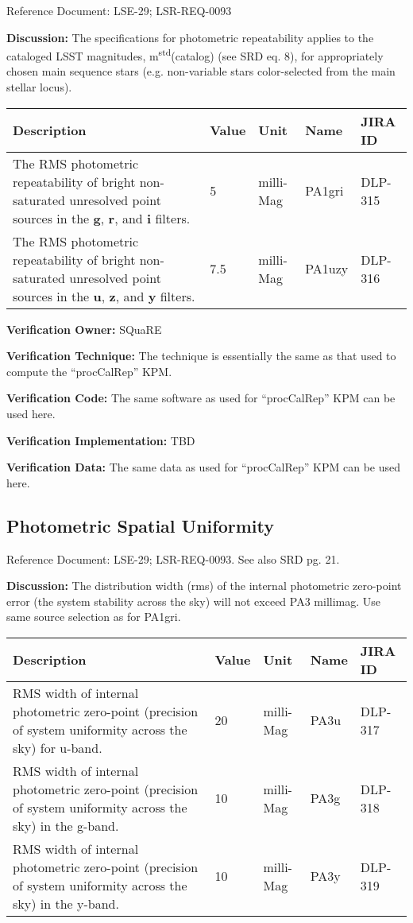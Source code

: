 \documentclass[DM,lsstdraft,toc]{lsstdoc}
\begin{document}
Reference Document: LSE-29; LSR-REQ-0093

\textbf{Discussion:} The specifications for photometric repeatability
applies to the cataloged LSST magnitudes,
m\textsuperscript{std}(catalog) (see SRD eq. 8), for appropriately
chosen main sequence stars (e.g. non-variable stars color-selected from
the main stellar locus).

\begin{longtable}[]{@{}p{}llll@{}}
\toprule
Description & Value & Unit & Name & JIRA ID\tabularnewline
\midrule
\endhead
The RMS photometric repeatability of bright non-saturated unresolved
point sources in the \textbf{g}, \textbf{r}, and \textbf{i} filters. & 5
& milli-Mag & PA1gri & DLP-315\tabularnewline
The RMS photometric repeatability of bright non-saturated unresolved
point sources in the \textbf{u}, \textbf{z}, and \textbf{y} filters. &
7.5 & milli-Mag & PA1uzy & DLP-316\tabularnewline
\bottomrule
\end{longtable}

\textbf{Verification Owner:} SQuaRE

\textbf{Verification Technique:} The technique is essentially the same
as that used to compute the ``procCalRep'' KPM.

\textbf{Verification Code:} The same software as used for ``procCalRep''
KPM can be used here.

\textbf{Verification Implementation:} TBD

\textbf{Verification Data:} The same data as used for ``procCalRep'' KPM
can be used here.

\subsection{Photometric Spatial
Uniformity}\label{photometric-spatial-uniformity}

Reference Document: LSE-29; LSR-REQ-0093. See also SRD pg. 21.

\textbf{Discussion:} The distribution width (rms) of the internal
photometric zero-point error (the system stability across the sky) will
not exceed PA3 millimag. Use same source selection as for PA1gri.

\begin{longtable}[]{@{}p{}llll@{}}
\toprule
Description & Value & Unit & Name & JIRA ID\tabularnewline
\midrule
\endhead
RMS width of internal photometric zero-point (precision of system
uniformity across the sky) for u-band. & 20 & milli-Mag & PA3u &
DLP-317\tabularnewline
RMS width of internal photometric zero-point (precision of system
uniformity across the sky) in the g-band. & 10 & milli-Mag & PA3g &
DLP-318\tabularnewline
RMS width of internal photometric zero-point (precision of system
uniformity across the sky) in the y-band. & 10 & milli-Mag & PA3y &
DLP-319\tabularnewline
\bottomrule
\end{longtable}
\end{document}
